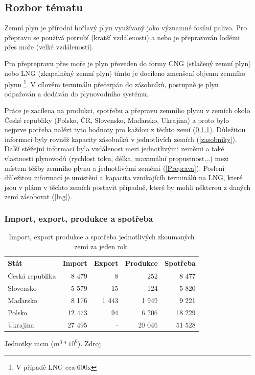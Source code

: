 \documentclass[a4paper,11pt]{article}
\begin{document}
\subsection{Rozbor tématu}\label{Rozbor}

Zemní plyn je přírodní hořlavý plyn využívaný jako významné fosilní palivo.
Pro přepravu se používá potrubí (kratší vzdálenosti) a nebo je 
přepravován loděmi přes moře (velké vzdálenosti).

Pro přeprepravu přes moře je plyn převeden do formy CNG (stlačený zemní plyn) nebo
LNG (zkapalněný zemní plyn) tímto je docíleno zmenšení objemu zemního plynu \footnote{V případě LNG cca 600x}.
V cílovém terminálu přečerpán do zásobníků, postupně je plyn odpařován a dodáván do plynovodního systému.

\vline

Práce je zacílena na produkci, spotřebu a přepravu zemního plynu v zemích okolo
České republiky (Polsko, ČR, Slovensko, Maďarsko, Ukrajina) a proto bylo nejprve potřeba
nalézt tyto hodnoty pro každou z těchto zemí (\ref{Zeme}). 
Důležitou informací byly rovněž kapacity zásobníků v jednotlivích zemích (\ref{zasobniky}).
Další stěžejní informací byla vzdálenost mezi jednotlivými zeměmi a také vlastnosti
plynovodů (rychlost toku, délka, maximální propustnost...)
mezi místem těžby zemního plynu a jednotlivými zeměmi (\ref{Preprava}).
Poslení důležitou informací je umístění a kapacita vznikajícíh terminálů na LNG,
které jsou v plánu v těchto zemích postavit případně, které by mohli některou z
daných zemí zásobovat (\ref{lng}).



\subsubsection{Import, export, produkce a spotřeba}\label{Zeme}
\begin{table}[h!]
\begin{center}
\begin{tabular}{|l|r|r|r|r|}
    \hline
    Stát 			& Import 	& Export & Produkce & Spotřeba \\
    \hline 
    Česká republika	& 8 479 		& 8 		& 252	& 8 477\\ 
    Slovensko 		& 5 579		& 15		& 124	& 5 820\\
    Maďarsko 		& 8 176		& 1 443	& 1 949	& 9 221\\
    Polsko 			& 12 473 	& 94 	& 6 206	& 18 229\\
    Ukrajina 		& 27 495 	& -		& 20 046 & 51 528 \\ \hline
\end{tabular}
\caption{Import, export produkce a spotřeba jednotlivých zkoumaných zemí za jeden rok.}
Jednotky mcm ($m^3 * 10^6$).  Zdroj \cite{IEA}
\label{rocni}
\end{center}
\end{table}
\end{document}
